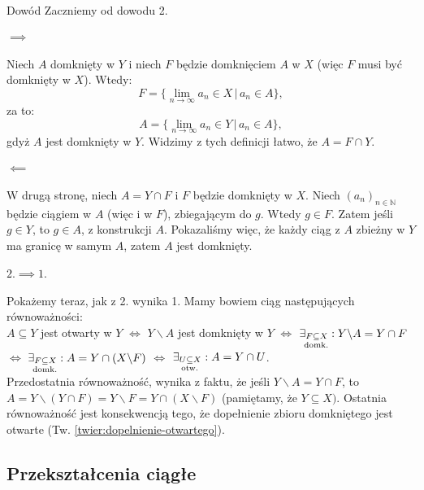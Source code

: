 \documentclass{article}
\newcounter{defi}
\numberwithin{defi}{section}
\numberwithin{defi}{section}
\newcommand{\N}{\mathbb{N}}
\newcommand{\oo}{\infty}
\newcommand{\subotw}{\underset{\clap{\scriptsize otw.}}{\subseteq}}
\newcommand{\subdomk}{\underset{\clap{\scriptsize domk.}}{\subseteq}}
\newcommand{\ciag}[1]{(#1_{n})_{n \in \N}}
\begin{document}
\begin{dow}{Dowód}
    Zaczniemy od dowodu 2.
    \paragraph{$\implies$} Niech $A$ domknięty w $Y$ i niech $F$ będzie domknięciem $A$ w $X$ (więc $F$ musi być domknięty w $X$). Wtedy: \begin{equation*}
        F = \{ \lim_{n \to \oo} a_n \in X \, \big| \, a_n \in A \},
    \end{equation*} za to:\begin{equation*}
        A = \{ \lim_{n \to \oo} a_n \in Y \, \big| \, a_n \in A \},
    \end{equation*}gdyż $A$ jest domknięty w $Y$. Widzimy z tych definicji łatwo, że $A = F \cap Y$.
    \paragraph{$\impliedby$} W drugą stronę, niech $A = Y \cap F$ i $F$ będzie domknięty w $X$. Niech $\ciag{a}$ będzie ciągiem w $A$ (więc i w $F$), zbiegającym do $g$. Wtedy $g \in F$. Zatem jeśli $g \in Y$, to $g \in A$, z konstrukcji $A$. Pokazaliśmy więc, że każdy ciąg z $A$ zbieżny w $Y$ ma granicę w samym $A$, zatem $A$ jest domknięty.
    \paragraph{$2. \implies 1.$} Pokażemy teraz, jak z 2. wynika 1. Mamy bowiem ciąg następujących równoważności: \\
    $A \subseteq Y$ jest otwarty w $Y$ $\iff$ $Y \backslash A$ jest domknięty w $Y$ $\iff$ $\exists_{F \subdomk X}: Y \backslash A = Y \cap F$ $\iff$ $ \exists_{F \subdomk X}: A = Y \cap (X \backslash F)$ $\iff$ $\exists_{U \subotw X}: A = Y \cap U$.\\
    Przedostatnia równoważność, wynika z faktu, że jeśli $Y \backslash A = Y \cap F$, to $A = Y \backslash (Y \cap F) = Y \backslash F =Y \cap (X \backslash F)$ (pamiętamy, że $Y\subseteq X)$.
    Ostatnia równoważność jest konsekwencją tego, że dopełnienie zbioru domkniętego jest otwarte (Tw. \ref{twier:dopelnienie-otwartego}).
\end{dow}

\subsection{Przekształcenia ciągłe}
\end{document}
